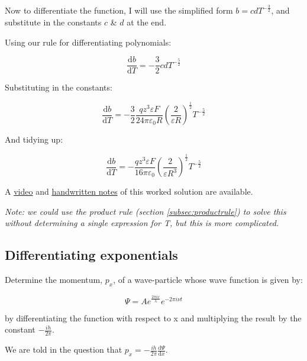 \documentclass[
]{book}
\begin{document}
Now to differentiate the function, I will use the simplified form \(b=cdT^{-\frac{3}{2}}\), and substitute in the constants \(c\) \& \(d\) at the end.

Using our rule for differentiating polynomials:

\begin{equation*}
\frac{\textrm{d}b}{\textrm{d}T}=-\frac{3}{2}cdT^{-\frac{5}{2}}
\end{equation*}

Substituting in the constants:

\begin{equation*}
\frac{\textrm{d}b}{\textrm{d}T}=-\frac{3}{2}\frac{qz^3\varepsilon F}{24 \pi \varepsilon_0R}\left( \frac{2}{ \varepsilon R} \right)^{\frac{1}{2}}T^{-\frac{5}{2}}
\end{equation*}

And tidying up:

\begin{equation*}
\frac{\textrm{d}b}{\textrm{d}T}=-\frac{qz^3\varepsilon F}{16 \pi \varepsilon_0}\left( \frac{2}{ \varepsilon R^3} \right)^{\frac{1}{2}}T^{-\frac{5}{2}}
\end{equation*}

A \href{https://youtu.be/h5FCt75G-Us}{video} and \href{http://workitoutwithapencil.xyz/wp-content/uploads/2021/08/Ex7.15.6-Determining-temp-dependence-of-b.pdf}{handwritten notes} of this worked solution are available.

\emph{Note: we could use the product rule (section \ref{subsec:productrule}) to solve this without determining a single expression for T, but this is more complicated.}

\hypertarget{subsec:exdiffexp}{%
\subsection{Differentiating exponentials}\label{subsec:exdiffexp}}

Determine the momentum, \(p_x\), of a wave-particle whose wave function is given by:

\begin{equation*}
\Psi = A e^{\frac{2 \pi i x}{\lambda}} e^{-2 \pi i \nu t}
\end{equation*}

by differentiating the function with respect to x and multiplying the result by the constant \(-\frac{ih}{2 \pi}\).

We are told in the question that \(p_x=-\frac{ih}{2 \pi}\frac{\textrm{d}\Psi}{\textrm{d}x}\).
\end{document}

